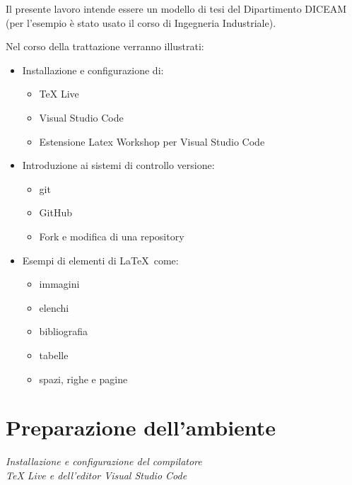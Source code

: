 \documentclass[envcountsame,envcountchap]{svmono}
\begin{document}
Il presente lavoro intende essere un modello di tesi del Dipartimento DICEAM 
(per l'esempio è stato usato il corso di Ingegneria Industriale).

Nel corso della trattazione verranno illustrati:
\label{esempio_elenco_puntato}
\begin{itemize}
    \item Installazione e configurazione di:
        \begin{itemize}
            \item TeX Live
            \item Visual Studio Code
            \item Estensione Latex Workshop per Visual Studio Code
        \end{itemize}
    \item Introduzione ai sistemi di controllo versione:
        \begin{itemize}
            \item git
            \item GitHub
            \item Fork e modifica di una repository
        \end{itemize}
    \item Esempi di elementi di \LaTeX\ come:
        \begin{itemize}
            \item immagini
            \item elenchi
            \item bibliografia
            \item tabelle
            \item spazi, righe e pagine
        \end{itemize}
\end{itemize}
  


\chapter{Preparazione dell'ambiente} \label{Cap.1}

\vspace{2cm}

\begin{flushright}
\textit{Installazione e configurazione del compilatore\\ TeX Live e dell'editor Visual Studio Code}
\end{flushright}

\vspace{0.5cm}
\end{document}
